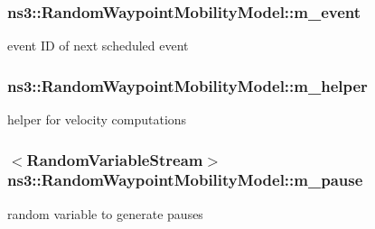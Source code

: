 \subsubsection[{\texorpdfstring{m\+\_\+event}{m_event}}]{ ns3\+::\+Random\+Waypoint\+Mobility\+Model\+::m\+\_\+event\hspace{0.3cm}{\ttfamily [private]}}\hypertarget{classns3_1_1RandomWaypointMobilityModel_a972b615df5f597fa3c8c6408a0d15907}{}\label{classns3_1_1RandomWaypointMobilityModel_a972b615df5f597fa3c8c6408a0d15907}


event ID of next scheduled event 

\subsubsection[{\texorpdfstring{m\+\_\+helper}{m_helper}}]{ ns3\+::\+Random\+Waypoint\+Mobility\+Model\+::m\+\_\+helper\hspace{0.3cm}{\ttfamily [private]}}\hypertarget{classns3_1_1RandomWaypointMobilityModel_a2e9ce665622899c64f915b4c1af74189}{}\label{classns3_1_1RandomWaypointMobilityModel_a2e9ce665622899c64f915b4c1af74189}


helper for velocity computations 

\subsubsection[{\texorpdfstring{m\+\_\+pause}{m_pause}}]{$<${\bf Random\+Variable\+Stream}$>$ ns3\+::\+Random\+Waypoint\+Mobility\+Model\+::m\+\_\+pause\hspace{0.3cm}{\ttfamily [private]}}\hypertarget{classns3_1_1RandomWaypointMobilityModel_a96ecd2f32821fa7ce41897191a8aab8d}{}\label{classns3_1_1RandomWaypointMobilityModel_a96ecd2f32821fa7ce41897191a8aab8d}


random variable to generate pauses 

